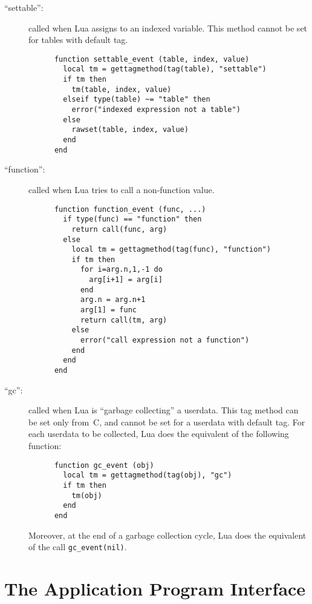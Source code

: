 \documentclass[11pt]{article}
\begin{document}
\begin{description}
\item[``settable'':]
called when Lua assigns to an indexed variable.
This method cannot be set for tables with default tag.
\begin{verbatim}
      function settable_event (table, index, value)
        local tm = gettagmethod(tag(table), "settable")
        if tm then
          tm(table, index, value)
        elseif type(table) ~= "table" then
          error("indexed expression not a table")
        else
          rawset(table, index, value)
        end
      end
\end{verbatim}

\item[``function'':]
called when Lua tries to call a non-function value.
\begin{verbatim}
      function function_event (func, ...)
        if type(func) == "function" then
          return call(func, arg)
        else
          local tm = gettagmethod(tag(func), "function")
          if tm then
            for i=arg.n,1,-1 do
              arg[i+1] = arg[i]
            end
            arg.n = arg.n+1
            arg[1] = func
            return call(tm, arg)
          else
            error("call expression not a function")
          end
        end
      end
\end{verbatim}

\item[``gc'':]
called when Lua is ``garbage collecting'' a userdata.
This tag method can be set only from~C,
and cannot be set for a userdata with default tag.
For each userdata to be collected,
Lua does the equivalent of the following function:
\begin{verbatim}
      function gc_event (obj)
        local tm = gettagmethod(tag(obj), "gc")
        if tm then
          tm(obj)
        end
      end
\end{verbatim}
Moreover, at the end of a garbage collection cycle,
Lua does the equivalent of the call \verb|gc_event(nil)|.

\end{description}




\section{The Application Program Interface}
\end{document}
